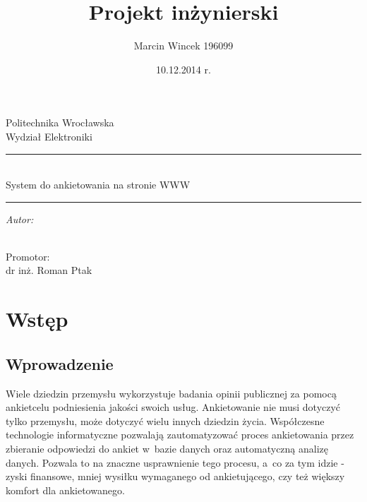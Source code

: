 \documentclass[8pt,a4paper,notitlepage]{article}
\begin{document}
\makeatletter
\newcommand{\linia}{\rule{\linewidth}{0.4mm}}
\renewcommand{\maketitle}{\begin{titlepage}
    \vspace*{1cm}
    \begin{center}\small
    Politechnika Wrocławska\\
    Wydział Elektroniki
    \end{center}
    \vspace{3cm}
    \noindent\linia
    \begin{center}
      \LARGE \textsc{\@title}\\
      \large System do ankietowania na stronie WWW
         \end{center}
     \linia
    \vspace{0.5cm}
    \begin{flushright}
    \begin{minipage}{6cm}
    \textit{\small Autor:}\\
    \normalsize \textsc{\@author} \par
    \end{minipage}
    \vspace{5cm}\\
     {\small Promotor:}\\
         dr inż. Roman Ptak
     \end{flushright}
    \vspace*{\stretch{6}}
    \begin{center}
    \@date
    \end{center}
  \end{titlepage}%
}
\makeatother
\author{Marcin Wincek 196099 }
\title{Projekt inżynierski}
\date{10.12.2014 r.}

\maketitle

\setcounter{page}{2}
\tableofcontents


\newpage
\section{Wstęp}
\subsection{Wprowadzenie}
Wiele dziedzin przemysłu wykorzystuje badania opinii publicznej za pomocą ankietcelu podniesienia jakości swoich usług. Ankietowanie nie musi dotyczyć tylko przemysłu, może dotyczyć wielu innych dziedzin życia. Współczesne technologie informatyczne pozwalają zautomatyzować proces ankietowania przez zbieranie odpowiedzi do ankiet w~bazie danych oraz automatyczną analizę danych. Pozwala to na znaczne usprawnienie tego procesu, a~co za tym idzie - zyski finansowe, mniej wysiłku wymaganego od ankietującego, czy też większy komfort dla ankietowanego. 
\end{document}
